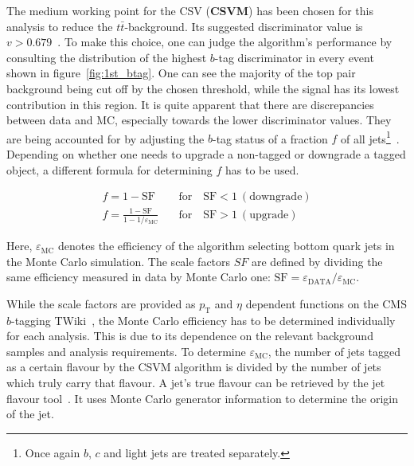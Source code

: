 The medium working point for the CSV (\textbf{CSVM}) has been chosen for this analysis to reduce the $t\bar{t}$-background. Its suggested discriminator value is $v > 0.679$~\cite{btagworkp}. To make this choice, one can judge the algorithm's performance by consulting the distribution of the highest $b$-tag discriminator in every event shown in figure~\ref{fig:1st_btag}. One can see the majority of the top pair background being cut off by the chosen threshold, while the signal has its lowest contribution in this region. It is quite apparent that there are discrepancies between data and MC, especially towards the lower discriminator values. They are being accounted for by adjusting the $b$-tag status of a fraction $f$ of all jets\footnote{Once again $b$, $c$ and light jets are treated separately.}~\cite{btageff}. Depending on whether one needs to upgrade a non-tagged or downgrade a tagged object, a different formula for determining $f$ has to be used.

\begin{align}
  \label{eq:btagsf}
  f = 1 - \text{SF} \quad & \text{for} \quad \text{SF} < 1\:(\text{downgrade}) \\
  f = \frac{1 - \text{SF}}{1- 1/\varepsilon_{\text{MC}}} \quad & \text{for} \quad \text{SF} > 1\:(\text{upgrade})
\end{align}

\noindent Here, $\varepsilon_{\text{MC}}$ denotes the efficiency of the algorithm selecting bottom quark jets in the Monte Carlo simulation. The scale factors $SF$ are defined by dividing the same efficiency measured in data by Monte Carlo one: $\text{SF} = \varepsilon_{\text{DATA}} / \varepsilon_{\text{MC}}$.

While the scale factors are provided as $p_{\text{T}}$ and $\eta$ dependent functions on the CMS $b$-tagging TWiki~\cite{btagtwiki}, the Monte Carlo efficiency has to be determined individually for each analysis. This is due to its dependence on the relevant background samples and analysis requirements. To determine $\varepsilon_{\text{MC}}$, the number of jets tagged as a certain flavour by the CSVM algorithm is divided by the number of jets which truly carry that flavour. A jet's true flavour can be retrieved by the jet flavour tool~\cite{jetflavtool}. It uses Monte Carlo generator information to determine the origin of the jet.

